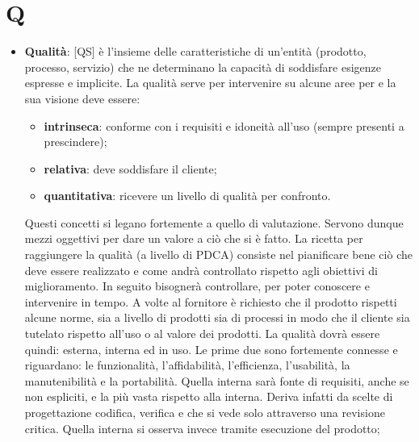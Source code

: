 %
%
%

\section{Q}

\begin{itemize}
	\item \textbf{Qualità}: [QS] è l'insieme delle caratteristiche di un'entità (prodotto, processo, servizio) che ne determinano la capacità di soddisfare esigenze espresse e implicite. La qualità serve per intervenire su alcune aree per e la sua visione deve essere:
		\begin{itemize}
			\item \textbf{intrinseca}: conforme con i requisiti e idoneità all'uso (sempre presenti a prescindere);
			\item \textbf{relativa}: deve soddisfare il cliente;
			\item \textbf{quantitativa}: ricevere un livello di qualità per confronto.
		\end{itemize}
		\noindent
		Questi concetti si legano fortemente a quello di valutazione. Servono dunque mezzi oggettivi per dare un valore a ciò che si è fatto. \newline
		La ricetta per raggiungere la qualità (a livello di PDCA) consiste nel pianificare bene ciò che deve essere realizzato e come andrà controllato rispetto agli obiettivi di miglioramento. In seguito bisognerà controllare, per poter conoscere e intervenire in tempo. \newline
		A volte al fornitore è richiesto che il prodotto rispetti alcune norme, sia a livello di prodotti sia di processi in modo che il cliente sia tutelato rispetto all'uso o al valore dei prodotti. \newline
		La qualità dovrà essere quindi: esterna, interna ed in uso. Le prime due sono fortemente connesse e riguardano: le funzionalità, l'affidabilità, l'efficienza, l'usabilità, la manutenibilità e la portabilità. Quella interna sarà fonte di requisiti, anche se non espliciti, e la più vasta rispetto alla interna. Deriva infatti da scelte di progettazione codifica, verifica e che si vede solo attraverso una revisione critica. Quella interna si osserva invece tramite esecuzione del prodotto;


\end{itemize}
